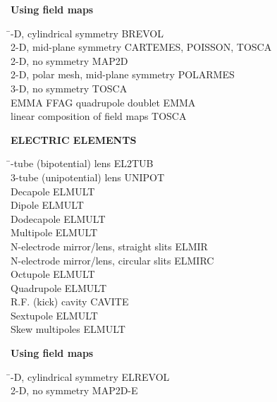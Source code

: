 \smallskip

\noindent\textbf{Using field maps}  

\begin{tabbing}
\hspace*{7cm} \= -D, cylindrical symmetry \> BREVOL \\
  2-D, mid-plane symmetry   \> CARTEMES, POISSON, TOSCA \\
  2-D, no symmetry          \> MAP2D \\
  2-D, polar mesh, mid-plane symmetry          \> POLARMES \\
  3-D, no symmetry          \> TOSCA \\
  EMMA FFAG quadrupole doublet       \> EMMA \\
  linear composition of field maps \> TOSCA 
\end{tabbing}

\bigskip

\bigskip

\noindent\textbf{ELECTRIC ELEMENTS}  

\begin{tabbing}
\hspace*{7cm} \= -tube (bipotential) lens \> EL2TUB \\
  3-tube (unipotential) lens \> UNIPOT \\
  Decapole                \> ELMULT \\
  Dipole                  \> ELMULT \\
  Dodecapole              \> ELMULT \\
  Multipole               \> ELMULT \\
  N-electrode mirror/lens, straight slits            \> ELMIR \\
  N-electrode mirror/lens, circular slits            \> ELMIRC \\
  Octupole                \> ELMULT \\
  Quadrupole              \> ELMULT \\
  R.F. (kick) cavity             \> CAVITE \\
  Sextupole               \> ELMULT \\
  Skew multipoles       \> ELMULT 
\end{tabbing}


\smallskip

\noindent\textbf{Using field maps} 

\begin{tabbing}
\hspace*{7cm} \= -D, cylindrical symmetry  \> ELREVOL  \\
  2-D, no symmetry          \> MAP2D-E 
\end{tabbing}

